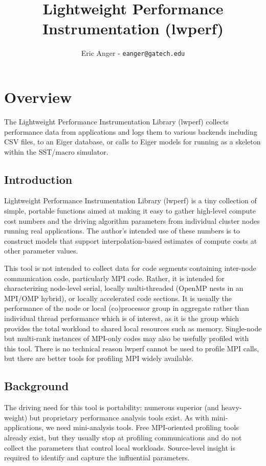 \documentclass{article}
\title{\textbf{Lightweight Performance Instrumentation (lwperf)}}
\author{Eric Anger - \texttt{eanger@gatech.edu}}
\date{}
\begin{document}
\maketitle
\tableofcontents
\clearpage
\section{Overview}
The Lightweight Performance Instrumentation Library (lwperf) collects performance data from applications and logs them to various backends including CSV files, to an Eiger database, or calls to Eiger models for running as a skeleton within the SST/macro simulator.

\label{sec:over}
\subsection{Introduction}
Lightweight Performance Instrumentation Library (lwperf) is a tiny collection of simple, portable functions aimed at making it easy to gather high-level compute cost numbers and the driving algorithm parameters from individual cluster nodes running real applications. The author's intended use of these numbers is to construct models that support interpolation-based estimates of compute costs at other parameter values. 

This tool is not intended to collect data for code segments containing inter-node communication code, particularly MPI code. Rather, it is intended for characterizing node-level serial, locally multi-threaded (OpenMP nests in an MPI/OMP hybrid), or locally accelerated code sections. It is usually the performance of the node or local (co)processor group in aggregate rather than individual thread performance which is of interest, as it is the group which provides the total workload to shared local resources such as memory. Single-node but multi-rank instances of MPI-only codes may also be usefully profiled with this tool. There is no technical reason lwperf cannot be used to profile MPI calls, but there are better tools for profiling MPI widely available.

\subsection{Background}
The driving need for this tool is portability: numerous superior (and heavy-weight) but proprietary performance analysis tools exist. As with mini-applications, we need mini-analysis tools.
Free MPI-oriented profiling tools already exist, but they usually stop at profiling communications and do not collect the parameters that control local workloads. Source-level insight is required to identify and capture the influential parameters.
\end{document}
